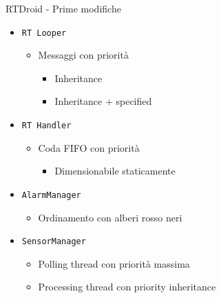 \begin{frame}{RTDroid - Prime modifiche}
	\begin{itemize}
		\item \texttt{RT Looper}
		\begin{itemize}
			\item Messaggi con priorità
			\begin{itemize}
				\item Inheritance
				\item Inheritance + specified
			\end{itemize}
		\end{itemize}
		\item \texttt{RT Handler}
		\begin{itemize}
			\item Coda FIFO con priorità
			\begin{itemize}
				\item Dimensionabile staticamente
			\end{itemize}
		\end{itemize}
		\item \texttt{AlarmManager}
		\begin{itemize}
			\item Ordinamento con alberi rosso neri
		\end{itemize}
		\item \texttt{SensorManager}
		\begin{itemize}
			\item Polling thread con priorità massima
			\item Processing thread con priority inheritance
		\end{itemize}
	\end{itemize}
\end{frame}